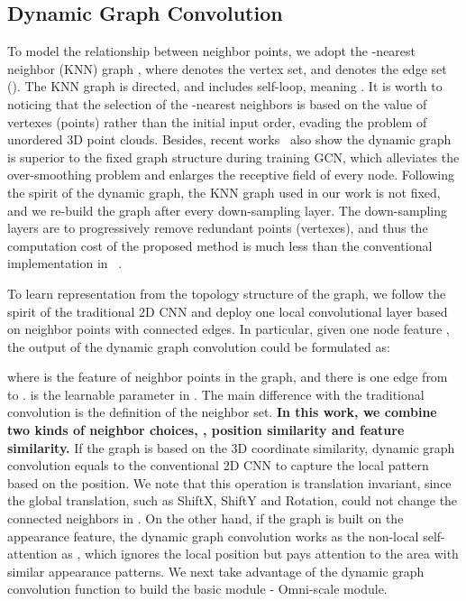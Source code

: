 \subsection{Dynamic Graph Convolution} 
To model the relationship between neighbor points, we adopt the -nearest neighbor (KNN) graph , where  denotes the vertex set, and  denotes the edge set (). The KNN graph is directed, and includes self-loop, meaning . It is worth to noticing that the selection of the  -nearest neighbors is based on the value of vertexes (points) rather than the initial input order, evading the problem of unordered 3D point clouds. 
Besides, recent works~\cite{wang2019dynamic,li2019deepgcns} also show the dynamic graph is superior to the fixed graph structure during training GCN, which alleviates the over-smoothing problem and enlarges the receptive field of every node. 
Following the spirit of the dynamic graph, the KNN graph used in our work is not fixed, and we re-build the graph after every down-sampling layer. The down-sampling layers are to progressively remove redundant points (vertexes), and thus the computation cost of the proposed method is much less than the conventional implementation in ~\cite{wang2019dynamic,li2019deepgcns}. 

To learn representation from the topology structure of the graph, we follow the spirit of the traditional 2D CNN and deploy one local convolutional layer based on neighbor points with connected edges. In particular, given one node feature , the output  of the dynamic graph convolution could be formulated as: 

where  is the feature of neighbor points in the graph, and there is one edge from  to .  is the learnable parameter in . The main difference with the traditional convolution is the definition of the neighbor set. \textbf{In this work, we combine two kinds of neighbor choices, \ie, position similarity and feature similarity.} If the graph  is based on the 3D coordinate similarity, dynamic graph convolution equals to the conventional 2D CNN to capture the local pattern based on the position. We note that this operation is translation invariant, since the global translation, such as ShiftX, ShiftY and Rotation, could not change the connected neighbors in .
On the other hand, if the graph  is built on the appearance feature, the dynamic graph convolution works as the non-local self-attention as \cite{wang2018non,zhang2018self}, which ignores the local position but pays attention to the area with similar appearance patterns. We next take advantage of the dynamic graph convolution function to build the basic module - Omni-scale module. 

